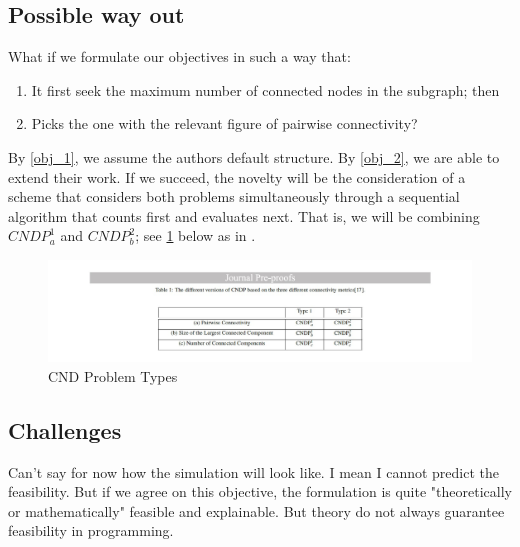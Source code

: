 \subsection{Possible way out}
What if we formulate our objectives in such a way that:
\begin{enumerate}
    \item It first seek the maximum number of connected nodes in the subgraph; then \label{obj_1}
    \item Picks the one with the relevant figure of pairwise connectivity? \label{obj_2}
\end{enumerate}
By \ref{obj_1}, we assume the authors default structure. By \ref{obj_2}, we are able to extend their work.
If we succeed, the novelty will be the consideration of a scheme that considers both problems simultaneously through a sequential algorithm that counts first and evaluates next. That is, we will be combining $CNDP_a^1$ and $CNDP_b^2$; see \ref{fig:cdnp} below as in \cite{rezaei2020eia}.
\begin{figure}[htb!]
\centering \includegraphics[width=\textwidth]{graphics/cndp.png}
\caption{CND Problem Types}
\label{fig:cdnp}
\end{figure}


\subsection{Challenges}
Can't say for now how the simulation will look like. I mean I cannot predict the feasibility. But if we agree on this objective, the formulation is quite "theoretically or mathematically" feasible and explainable. But theory do not always guarantee feasibility in programming.


